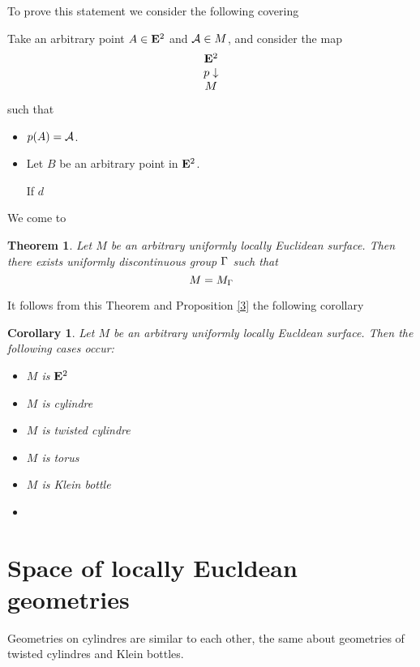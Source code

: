 \documentclass[12pt]{article}
\newtheorem{theorem}{Theorem}
\newtheorem{corollary}{Corollary}
\theoremstyle{definition}
\numberwithin{equation}{section}
\begin{document}
To prove this statement we consider the following covering

Take an arbitrary point $A\in {\bf E}^2$ and ${\cal A}\in M$,
and consider the map
   $$
  \begin{matrix}
        {\bf E}^2\cr
         p\downarrow\cr
          M\cr
     \end{matrix}
      $$
such that
  
\begin{itemize}

\item
$p(A)={\cal A}$.


\item Let $B$ be an arbitrary point in ${\bf E}^2$.

If $d$


\end{itemize}
We come to 

\begin{theorem}  Let $M$ be an arbitrary 
uniformly locally Euclidean surface. Then there
exists uniformly discontinuous group
  ${\Gamma}$ such that 
       $$
    M=M_{\Gamma}
       $$
\end{theorem}

It follows from this Theorem and Proposition \ref{3}
the following corollary

\begin{corollary} Let  $M$
be an arbitrary uniformly locally Eucldean
surface. Then the following cases occur:

  \begin{itemize}
\item  $M$ is ${\bf E}^2$


\item $M$ is cylindre

\item $M$ is twisted cylindre

\item $M$ is torus

\item $M$ is Klein bottle
\item
  \end{itemize}
\end{corollary}


\section {Space of locally Eucldean geometries}

  Geometries on cylindres are similar to each other,
  the same about geometries of twisted cylindres and Klein 
bottles.
\end{document}
